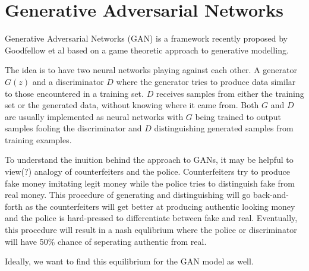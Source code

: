 \section{Generative Adversarial Networks}
\label{sec:gan}

Generative Adversarial Networks (GAN) is a framework recently proposed by Goodfellow et al based on a game theoretic approach to generative modelling.

The idea is to have two neural networks playing against each other.
A generator $G(z)$ and a discriminator $D$ where the generator tries to produce data similar to those encountered in a training set. $D$ receives samples from either the training set or the generated data, without knowing where it came from.
Both $G$ and $D$ are usually implemented as neural networks with $G$ being trained to output samples fooling the discriminator and $D$ distinguishing generated samples from training examples.

To understand the inuition behind the approach to GANs, it may be helpful to view(?) analogy of counterfeiters and the police.
Counterfeiters try to produce fake money imitating legit money while the police tries to distinguish fake from real money.
This procedure of generating and distinguishing will go back-and-forth as the counterfeiters will get better at producing authentic looking money and the police is hard-pressed to differentiate between fake and real.
Eventually, this procedure will result in a nash equlibrium where the police or discriminator will have 50\% chance of seperating authentic from real.

Ideally, we want to find this equilibrium for the GAN model as well.





